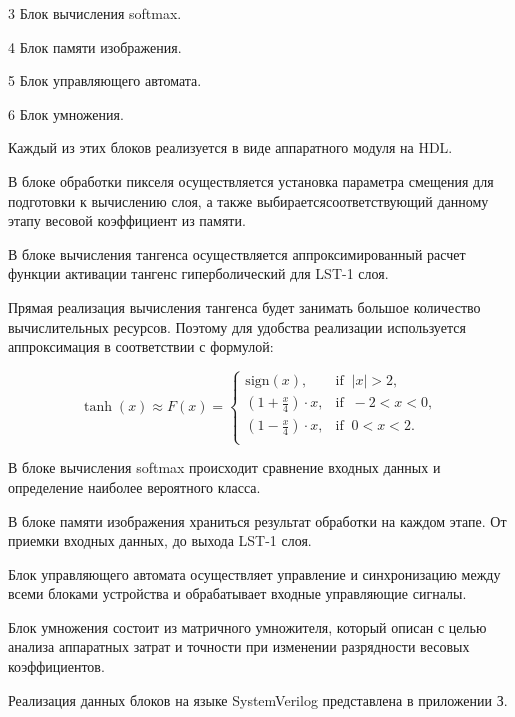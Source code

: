  3 Блок вычисления softmax.

  4 Блок памяти изображения.

  5 Блок управляющего автомата.

  6 Блок умножения.

Каждый из этих блоков реализуется в виде аппаратного модуля на HDL.\@

В блоке обработки пикселя осуществляется установка параметра смещения для 
подготовки к вычислению слоя, а также выбираетсясоответствующий данному этапу 
весовой коэффициент из памяти.

В блоке вычисления тангенса осуществляется аппроксимированный расчет функции 
активации тангенс гиперболический для LST-1 слоя.

Прямая реализация вычисления тангенса будет занимать большое количество 
вычислительных ресурсов. Поэтому для удобства реализации используется 
аппроксимация в соответствии с формулой\cite{TANH}:

\begin{equation}
    \tanh{(x)}\approx F(x) = 
      \begin{cases}
      \mathrm{sign}(x),         & \mathrm{if}\;\;  |x|>2, \\
      (1 + \frac{x}{4})\cdot x, & \mathrm{if}\;\; -2<x<0, \\
      (1 - \frac{x}{4})\cdot x, & \mathrm{if}\;\;  0<x<2. \\
      \end{cases}
\end{equation}

В блоке вычисления softmax происходит сравнение входных данных и определение 
наиболее вероятного класса.

В блоке памяти изображения храниться результат обработки на каждом этапе. От 
приемки входных данных, до выхода LST-1 слоя.

Блок управляющего автомата осуществляет управление и синхронизацию между всеми 
блоками устройства и обрабатывает входные управляющие сигналы.

Блок умножения состоит из матричного умножителя, который описан с целью анализа
аппаратных затрат и точности при изменении разрядности весовых коэффициентов.

Реализация данных блоков на языке SystemVerilog представлена в приложении З.

